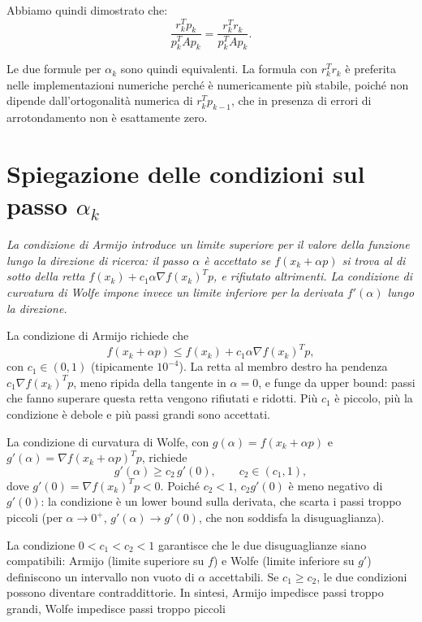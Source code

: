 \documentclass[italian, a4paper, twoside, binding=6mm]{sapthesis}
\begin{document}
Abbiamo quindi dimostrato che:
\[
\frac{r_k^T p_k}{p_k^T A p_k} = \frac{r_k^T r_k}{p_k^T A p_k}.
\]

Le due formule per $\alpha_k$ sono quindi equivalenti. La formula con $r_k^T r_k$ è preferita nelle implementazioni numeriche perché è numericamente più stabile, poiché non dipende dall'ortogonalità numerica di $r_k^T p_{k-1}$, che in presenza di errori di arrotondamento non è esattamente zero.
\newpage
\section{Spiegazione delle condizioni sul passo $\alpha_k$}\label{app:wolfe}
\textit{
La condizione di Armijo introduce un limite superiore per il valore della funzione lungo la direzione di ricerca: il passo $\alpha$ è accettato se $f(x_k+\alpha p)$ si trova al di sotto della retta $f(x_k)+c_1\alpha\nabla f(x_k)^Tp$, e rifiutato altrimenti. La condizione di curvatura di Wolfe impone invece un limite inferiore per la derivata $f'(\alpha)$ lungo la direzione.
}

La condizione di Armijo richiede che
\[
f(x_k+\alpha p) \le f(x_k) + c_1 \alpha \nabla f(x_k)^T p,
\]
con $c_1 \in (0,1)$ (tipicamente $10^{-4}$). La retta al membro destro ha pendenza $c_1\nabla f(x_k)^Tp$, meno ripida della tangente in $\alpha=0$, e funge da upper bound: passi che fanno superare questa retta vengono rifiutati e ridotti. Più $c_1$ è piccolo, più la condizione è debole e più passi grandi sono accettati.

La condizione di curvatura di Wolfe, con $g(\alpha)=f(x_k+\alpha p)$ e $g'(\alpha)=\nabla f(x_k+\alpha p)^Tp$, richiede
\[
g'(\alpha) \ge c_2 \, g'(0), \qquad c_2 \in (c_1,1),
\]
dove $g'(0)=\nabla f(x_k)^Tp<0$. Poiché $c_2<1$, $c_2g'(0)$ è meno negativo di $g'(0)$: la condizione è un lower bound sulla derivata, che scarta i passi troppo piccoli (per $\alpha\to0^+$, $g'(\alpha)\to g'(0)$, che non soddisfa la disuguaglianza).

La condizione $0<c_1<c_2<1$ garantisce che le due disuguaglianze siano compatibili: Armijo (limite superiore su $f$) e Wolfe (limite inferiore su $g'$) definiscono un intervallo non vuoto di $\alpha$ accettabili. Se $c_1\ge c_2$, le due condizioni possono diventare contraddittorie. In sintesi, Armijo impedisce passi troppo grandi, Wolfe impedisce passi troppo piccoli
\end{document}
